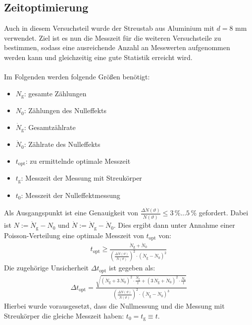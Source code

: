 \documentclass[german,  %
parskip=full,  %
]{scrartcl}
\begin{document}
\subsection{Zeitoptimierung}
Auch in diesem Versuchsteil wurde der Streustab aus Aluminium mit $d=8$ mm verwendet. Ziel ist es nun die Messzeit für die weiteren Versuchsteile zu bestimmen, sodass eine ausreichende Anzahl an Messwerten aufgenommen werden kann und gleichzeitig eine gute Statistik erreicht wird. \\\\
Im Folgenden werden folgende Größen benötigt:
\begin{itemize}
\item $N_{\text{g}}$: gesamte Zählungen
\item $N_0$: Zählungen des Nulleffekts
\item $\dot{N}_{\text{g}}$: Gesamtzählrate
\item $\dot{N}_0$: Zählrate des Nulleffekts
\item $t_{\text{opt}}$: zu ermittelnde optimale Messzeit
\item $t_{\text{g}}$: Messzeit der Messung mit Streukörper
\item $t_{0}$: Messzeit der Nulleffektmessung
\end{itemize}
Als Ausgangspunkt ist eine Genauigkeit von $\frac{\Delta \dot{N} (\vartheta)}{\dot{N} (\vartheta)} \leq 3\, \%...5 \, \%$ gefordert. Dabei ist $N := \dot{N}_{\text{g}} - N_0$ und $\dot{N} := \dot{N}_{\text{g}} - \dot{N}_0$. Dies ergibt dann unter Annahme einer Poisson-Verteilung eine optimale Messzeit von $t_{\text{opt}}$ von:
\begin{align}
\label{zeit1}
t_{\text{opt}} \geq \frac{\dot{N}_{\text{g}} + \dot{N}_0}{\left(\frac{\Delta \dot{N} (\vartheta)}{\dot{N} (\vartheta)}\right)^2 \cdot \left(\dot{N}_{\text{g}}-\dot{N}_0\right)^2}
\end{align}
Die zugehörige Unsicherheit $\Delta t_{\text{opt}}$ ist gegeben als:
\begin{align}
\label{zeit2}
\Delta t_{\text{opt}} = \frac{\sqrt{\left(\dot{N}_{\text{g}}+ 3 \, \dot{N}_0\right)^2 \cdot \frac{\dot{N}_{\text{g}}}{t}+\left(3\,\dot{N}_{\text{g}}+\dot{N}_0\right)^2 \cdot \frac{\dot{N}_0}{t}}}{\left(\frac{\Delta \dot{N} (\vartheta)}{\dot{N} (\vartheta)}\right)^2 \cdot \left(\dot{N}_{\text{g}}-\dot{N}_0\right)^3}
\end{align}
Hierbei wurde vorausgesetzt, dass die Nullmessung und die Messung mit Streukörper die gleiche Messzeit haben: $t_{0} = t_{\text{g}} \equiv t$.
\\\\
\end{document}
